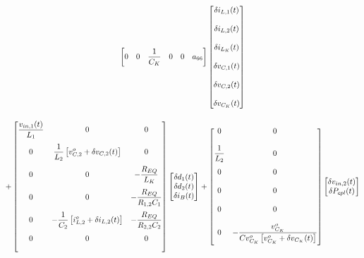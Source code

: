 \begin{gather}
\begin{bmatrix}
    0                         & 0                         & \displaystyle \frac{1}{C_K}                         & 0                                    & 0                                    & a_{66}
  \end{bmatrix}
  \begin{bmatrix}
    \delta i_{L,1}(t) \\[12pt] \delta i_{L,2}(t) \\[12pt] \delta i_{L_K}(t) \\[12pt]
    \delta v_{C,1}(t) \\[12pt] \delta v_{C,2}(t) \\[12pt] \delta v_{C_K}(t)
  \end{bmatrix} \notag \\[12pt] +
  \begin{bmatrix}
    \displaystyle \frac{v_{in,1}(t)}{L_1} & 0                 & 0                                                        \\[12pt]
    0                      & \displaystyle \frac{1}{L_2} \left[ v_{C,2}^o + \delta v_{C,2}(t) \right]     & 0                              
                                    \\[12pt]
    0                      & 0                 & - \displaystyle \frac{R_{EQ}}{L_K}                                     \\[12pt]
    0                      & 0                 & - \displaystyle \frac{R_{EQ}}{R_{1,2}C_1}                    \\[12pt]
    0                      & - \displaystyle \frac{1}{C_2} \left[ i_{L,2}^o + \delta i_{L,2}(t) \right]                 & - \displaystyle \frac{R_{EQ}}{R_{2,2}C_2}                                      \\[12pt]
    0                      & 0                 & 0 
                                    \\[12pt]
  \end{bmatrix}
  \begin{bmatrix}
    \delta d_1(t) \\ \delta d_2(t) \\ \delta i_{B}(t)
  \end{bmatrix} +
  \begin{bmatrix}
      0                   & 0
                            \\[12pt]
      \displaystyle \frac{1}{L_2}   & 0 
                            \\[12pt]
      0                   & 0
                            \\[12pt]
      0                   & 0
                            \\[12pt]
      0                   & 0
                            \\[12pt]
      0                   & - \displaystyle \frac{v_{C_K}^o}{Cv_{C_K}^o \left[ v_{C_K}^o + \delta v_{C_K}(t) \right]}
                            \\[12pt]
  \end{bmatrix}
  \begin{bmatrix}
    \delta v_{in,2}(t) \\ \delta P_{cpl}(t)
  \end{bmatrix}
\end{gather}

